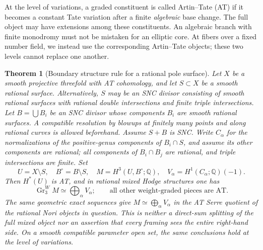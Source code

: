 \documentclass[11pt,a4paper,oneside]{article}
\theoremstyle{plain}
\newtheorem{theorem}{Theorem}[section]
\theoremstyle{definition}
\theoremstyle{remark}
\newcommand{\Q}{\mathbb Q}
\numberwithin{equation}{section}
\begin{document}
At the level of variations, a graded constituent is called Artin--Tate (AT)
if it becomes a constant Tate variation after a finite \emph{algebraic} base change.
The full object may have extensions among these constituents. An algebraic branch with finite monodromy must not be mistaken for an elliptic core.
At fibers over a fixed number field, we instead use the corresponding Artin--Tate objects; these two levels cannot replace one another.

\begin{theorem}[Boundary structure rule for a rational pole surface]\label{unified:thm:boundaryweight}
Let $X$ be a smooth projective threefold with AT cohomology, and let $S\subset X$ be a smooth rational surface.
Alternatively, $S$ may be an SNC divisor consisting of smooth rational surfaces with rational double intersections and finite triple intersections.
Let $B=\bigcup B_i$ be an SNC divisor whose components $B_i$ are smooth rational surfaces.
A compatible resolution by blowups at finitely many points and along rational curves is allowed beforehand.
Assume $S+B$ is SNC. Write $C_\alpha$ for the normalizations of the positive-genus components of $B_i\cap S$,
and assume its other components are rational; all components of $B_i\cap B_j$ are rational, and triple intersections are finite.
Set
\[
 U=X\setminus S,\quad B^\circ=B\setminus S,\quad
 M=H^3(U,B^\circ;\Q),\quad V_\alpha=H^1(C_\alpha;\Q)(-1).
\]
Then $H^*(U)$ is AT, and in rational mixed Hodge structures one has
\begin{equation}\label{unified:eq:boundaryweight}
 \operatorname{Gr}^W_3 M\simeq\bigoplus_\alpha V_\alpha;
 \qquad\text{all other weight-graded pieces are AT.}
\end{equation}
The same geometric exact sequences give
$M\simeq\bigoplus_\alpha V_\alpha$ in the AT Serre quotient of the rational Nori objects in question.
This is neither a direct-sum splitting of the full mixed object nor an assertion that every framing sees the entire right-hand side.
On a smooth compatible parameter open set, the same conclusions hold at the level of variations.
\end{theorem}
\end{document}
